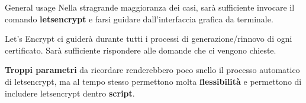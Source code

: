 \documentclass[xcolor=svgnames,11pt]{beamer}
\begin{document}
\begin{frame}[fragile]{General usage}
Nella stragrande maggioranza dei casi, sarà sufficiente invocare il comando
\textbf{letsencrypt} e farsi guidare dall'interfaccia grafica da terminale.

\medskip\pause

Let's Encrypt ci guiderà durante tutti i processi di generazione/rinnovo
di ogni certificato. Sarà sufficiente rispondere alle domande che ci vengono
chieste.

\medskip\pause

\textbf{Troppi parametri} da ricordare renderebbero poco snello il processo automatico
di letsencrypt, ma al tempo stesso permettono molta \textbf{flessibilità} e permettono
di includere letsencrypt dentro \textbf{script}.

\end{frame}
\end{document}
